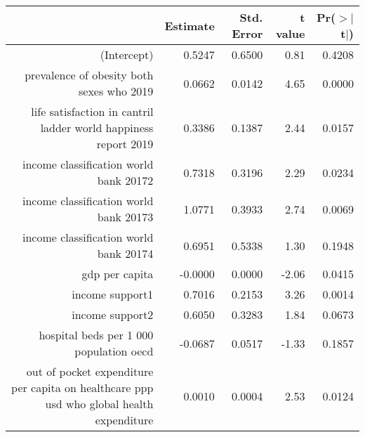 \begin{table}[ht]
\centering
\begin{tabular}{rrrrr}
  \hline
 & Estimate & Std. Error & t value & Pr($>$$|$t$|$) \\ 
  \hline
(Intercept) & 0.5247 & 0.6500 & 0.81 & 0.4208 \\ 
  prevalence of obesity both sexes who 2019 & 0.0662 & 0.0142 & 4.65 & 0.0000 \\ 
  life satisfaction in cantril ladder world happiness report 2019 & 0.3386 & 0.1387 & 2.44 & 0.0157 \\ 
  income classification world bank 20172 & 0.7318 & 0.3196 & 2.29 & 0.0234 \\ 
  income classification world bank 20173 & 1.0771 & 0.3933 & 2.74 & 0.0069 \\ 
  income classification world bank 20174 & 0.6951 & 0.5338 & 1.30 & 0.1948 \\ 
  gdp per capita & -0.0000 & 0.0000 & -2.06 & 0.0415 \\ 
  income support1 & 0.7016 & 0.2153 & 3.26 & 0.0014 \\ 
  income support2 & 0.6050 & 0.3283 & 1.84 & 0.0673 \\ 
  hospital beds per 1 000 population oecd & -0.0687 & 0.0517 & -1.33 & 0.1857 \\ 
  out of pocket expenditure per capita on healthcare ppp usd who global health expenditure & 0.0010 & 0.0004 & 2.53 & 0.0124 \\ 
   \hline
\end{tabular}
\end{table}
